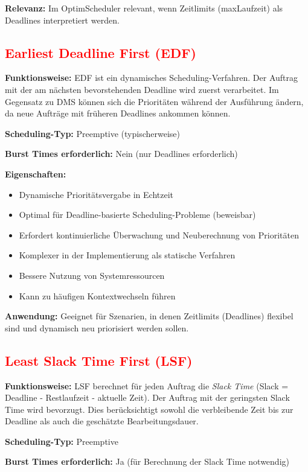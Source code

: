 \textbf{Relevanz:} Im OptimScheduler relevant, wenn Zeitlimits (maxLaufzeit) als Deadlines interpretiert werden.

\subsection{\textcolor{red}{Earliest Deadline First (EDF)}}

\textbf{Funktionsweise:} EDF ist ein dynamisches Scheduling-Verfahren. Der Auftrag mit der am nächsten bevorstehenden Deadline wird zuerst verarbeitet. Im Gegensatz zu DMS können sich die Prioritäten während der Ausführung ändern, da neue Aufträge mit früheren Deadlines ankommen können.

\textbf{Scheduling-Typ:} Preemptive (typischerweise)

\textbf{Burst Times erforderlich:} Nein (nur Deadlines erforderlich)

\textbf{Eigenschaften:}
\begin{itemize}
    \item Dynamische Prioritätsvergabe in Echtzeit
    \item Optimal für Deadline-basierte Scheduling-Probleme (beweisbar)
    \item Erfordert kontinuierliche Überwachung und Neuberechnung von Prioritäten
    \item Komplexer in der Implementierung als statische Verfahren
    \item Bessere Nutzung von Systemressourcen
    \item Kann zu häufigen Kontextwechseln führen
\end{itemize}

\textbf{Anwendung:} Geeignet für Szenarien, in denen Zeitlimits (Deadlines) flexibel sind und dynamisch neu priorisiert werden sollen.

\subsection{\textcolor{red}{Least Slack Time First (LSF)}}

\textbf{Funktionsweise:} LSF berechnet für jeden Auftrag die \textit{Slack Time} (Slack = Deadline - Restlaufzeit - aktuelle Zeit). Der Auftrag mit der geringsten Slack Time wird bevorzugt. Dies berücksichtigt sowohl die verbleibende Zeit bis zur Deadline als auch die geschätzte Bearbeitungsdauer.

\textbf{Scheduling-Typ:} Preemptive

\textbf{Burst Times erforderlich:} Ja (für Berechnung der Slack Time notwendig)

